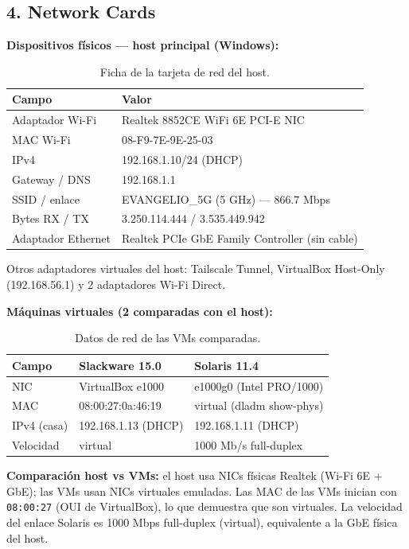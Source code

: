 \subsection{4. Network Cards}

\textbf{Dispositivos físicos --- host principal (Windows):}

\begin{table}[H]
  \centering
  \begin{tabular}{ll}
    \toprule
    Campo & Valor \\
    \midrule
    Adaptador Wi-Fi & Realtek 8852CE WiFi 6E PCI-E NIC \\
    MAC Wi-Fi & 08-F9-7E-9E-25-03 \\
    IPv4 & 192.168.1.10/24 (DHCP) \\
    Gateway / DNS & 192.168.1.1 \\
    SSID / enlace & EVANGELIO\_5G (5 GHz) --- 866.7 Mbps \\
    Bytes RX / TX & 3.250.114.444 / 3.535.449.942 \\
    Adaptador Ethernet & Realtek PCIe GbE Family Controller (sin cable) \\
    \bottomrule
  \end{tabular}
  \caption{Ficha de la tarjeta de red del host.}
\end{table}

Otros adaptadores virtuales del host: Tailscale Tunnel, VirtualBox Host-Only (192.168.56.1) y 2 adaptadores Wi-Fi Direct.

\textbf{Máquinas virtuales (2 comparadas con el host):}

\begin{table}[H]
  \centering
  \begin{tabular}{lll}
    \toprule
    Campo & Slackware 15.0 & Solaris 11.4 \\
    \midrule
    NIC & VirtualBox e1000 & e1000g0 (Intel PRO/1000) \\
    MAC & 08:00:27:0a:46:19 & virtual (dladm show-phys) \\
    IPv4 (casa) & 192.168.1.13 (DHCP) & 192.168.1.11 (DHCP) \\
    Velocidad & virtual & 1000 Mb/s full-duplex \\
    \bottomrule
  \end{tabular}
  \caption{Datos de red de las VMs comparadas.}
\end{table}

\textbf{Comparación host vs VMs:} el host usa NICs físicas Realtek (Wi-Fi 6E + GbE); las VMs usan NICs virtuales emuladas. Las MAC de las VMs inician con \texttt{08:00:27} (OUI de VirtualBox), lo que demuestra que son virtuales. La velocidad del enlace Solaris es 1000 Mbps full-duplex (virtual), equivalente a la GbE física del host.

